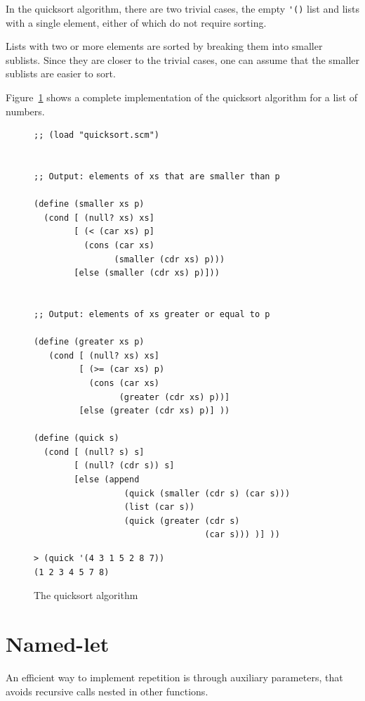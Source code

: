 \documentclass[a4paper,12pt]{book}
\newenvironment{fmpage}[1]
{\begin{lrbox}{\fmbox}\begin{minipage}{#1}}
{\end{minipage}\end{lrbox}\fbox{\usebox{\fmbox}}}
\begin{document}
In the quicksort algorithm,
there are two trivial cases,
the empty \verb|'()| list
and lists with a single element,
either of which
do not require sorting.

Lists with two or more elements
are sorted by breaking them into
smaller sublists. Since they are
closer to the trivial cases,
one can assume that the smaller sublists
are easier to sort.

Figure~\ref{quicksort} shows a complete
implementation of the quicksort algorithm
for a list of numbers.

\begin{figure}[!h]
\begin{fmpage}{0.9\linewidth}
\begin{verbatim}
;; (load "quicksort.scm")


;; Output: elements of xs that are smaller than p

(define (smaller xs p)
  (cond [ (null? xs) xs]
        [ (< (car xs) p]
          (cons (car xs)
                (smaller (cdr xs) p)))
        [else (smaller (cdr xs) p)]))


;; Output: elements of xs greater or equal to p

(define (greater xs p)
   (cond [ (null? xs) xs]
         [ (>= (car xs) p)
           (cons (car xs)
                 (greater (cdr xs) p))]
         [else (greater (cdr xs) p)] )) 

(define (quick s)
  (cond [ (null? s) s]
        [ (null? (cdr s)) s]
        [else (append 
                  (quick (smaller (cdr s) (car s)))
                  (list (car s))
                  (quick (greater (cdr s)
                                  (car s))) )] ))

\end{verbatim}
\end{fmpage}

\begin{fmpage}{0.9\linewidth}
\begin{verbatim}
> (quick '(4 3 1 5 2 8 7))
(1 2 3 4 5 7 8)
\end{verbatim}
\end{fmpage}
\caption{The quicksort algorithm}
\label{quicksort}
\end{figure}

\section{Named-let}

An efficient way to implement repetition is through auxiliary
parameters, that avoids recursive calls nested in other
functions.\\
\end{document}
